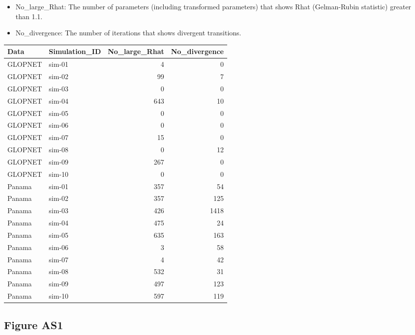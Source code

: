\documentclass[
  12pt,
  letterpaper,
  DIV=11,
  numbers=noendperiod]{scrartcl}
\begin{document}
\begin{itemize}
\item
  No\_large\_Rhat: The number of parameters (including transformed
  parameters) that shows Rhat (Gelman-Rubin statistic) greater than 1.1.
\item
  No\_divergence: The number of iterations that shows divergent
  transitions.
\end{itemize}

\begin{longtable*}[t]{llrr}
\toprule
Data & Simulation\_ID & No\_large\_Rhat & No\_divergence\\
\midrule
GLOPNET & sim-01 & 4 & 0\\
GLOPNET & sim-02 & 99 & 7\\
GLOPNET & sim-03 & 0 & 0\\
GLOPNET & sim-04 & 643 & 10\\
GLOPNET & sim-05 & 0 & 0\\
\addlinespace
GLOPNET & sim-06 & 0 & 0\\
GLOPNET & sim-07 & 15 & 0\\
GLOPNET & sim-08 & 0 & 12\\
GLOPNET & sim-09 & 267 & 0\\
GLOPNET & sim-10 & 0 & 0\\
\addlinespace
Panama & sim-01 & 357 & 54\\
Panama & sim-02 & 357 & 125\\
Panama & sim-03 & 426 & 1418\\
Panama & sim-04 & 475 & 24\\
Panama & sim-05 & 635 & 163\\
\addlinespace
Panama & sim-06 & 3 & 58\\
Panama & sim-07 & 4 & 42\\
Panama & sim-08 & 532 & 31\\
Panama & sim-09 & 497 & 123\\
Panama & sim-10 & 597 & 119\\
\bottomrule
\end{longtable*}

\newpage

\subsection{Figure AS1}\label{figure-as1}
\end{document}
